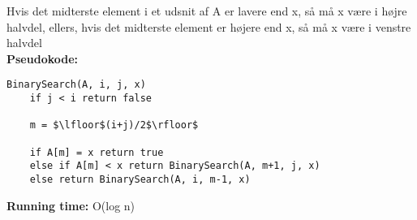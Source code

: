 Hvis det midterste element i et udsnit af A er lavere end x, så må x være i højre halvdel, ellers, hvis det midterste element er højere end x, så må x være i venstre halvdel\\
\textbf{Pseudokode:}
\begin{lstlisting}[frame=single, mathescape=true]
BinarySearch(A, i, j, x)
	if j < i return false

	m = $\lfloor$(i+j)/2$\rfloor$

	if A[m] = x return true
	else if A[m] < x return BinarySearch(A, m+1, j, x)
	else return BinarySearch(A, i, m-1, x)
\end{lstlisting}
\textbf{Running time:} O(log n)